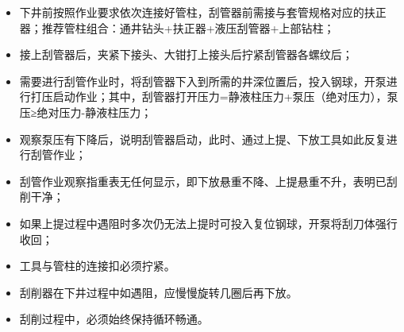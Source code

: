 \begin{itemize}
	\item 下井前按照作业要求依次连接好管柱，刮管器前需接与套管规格对应的扶正器；推荐管柱组合：通井钻头+扶正器+液压刮管器+上部钻柱；
	\item 接上刮管器后，夹紧下接头、大钳打上接头后拧紧刮管器各螺纹后；
	\item 需要进行刮管作业时，将刮管器下入到所需的井深位置后，投入钢球，开泵进行打压启动作业；其中，刮管器打开压力=静液柱压力+泵压（绝对压力），泵压≥绝对压力-静液柱压力；
	\item 观察泵压有下降后，说明刮管器启动，此时、通过上提、下放工具如此反复进行刮管作业；
	\item 刮管作业观察指重表无任何显示，即下放悬重不降、上提悬重不升，表明已刮削干净；
	\item 如果上提过程中遇阻时多次仍无法上提时可投入复位钢球，开泵将刮刀体强行收回；
	\end{itemize}
	\begin{itemize}
		\item 工具与管柱的连接扣必须拧紧。
		\item 刮削器在下井过程中如遇阻，应慢慢旋转几圈后再下放。
		\item 刮削过程中，必须始终保持循环畅通。
	\end{itemize}
